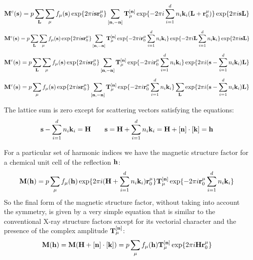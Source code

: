 \documentclass[10pt]{article}
\begin{document}
\begin{equation} \label{amplitude_mag3}
{\bf M}^c({\bf s})=p\sum_{\bf L} \sum_{{\mu}} f_{\mu}({\bf s}) \exp\{2\pi i {\bf s}{\bf r}_0^\mu\}\sum_{[{\bf n},-{\bf n}]}  {\bf T}_{\mu}^{[{\bf n}]} \exp\{ -2\pi i \sum_{i=1}^d n_i{\bf k}_i ({\bf L}+{\bf r}_0^\mu) \}  \exp\{2\pi i {\bf s}{\bf L}\}
\end{equation}
\begin{equation} \label{amplitude_mag5}
{\bf M}^c({\bf s})=p\sum_{\bf L} \sum_{{\mu}} f_{\mu}({\bf s}) \exp\{2\pi i {\bf s}{\bf r}_0^\mu\}\sum_{[{\bf n},-{\bf n}]}  {\bf T}_{\mu}^{[{\bf n}]} \exp\{ -2\pi i {\bf r}_0^\mu \sum_{i=1}^d n_i{\bf k}_i \} \exp\{ -2\pi i {\bf L} \sum_{i=1}^d n_i{\bf k}_i  \} \exp\{2\pi i {\bf s}{\bf L}\}
\end{equation}
\begin{equation} \label{amplitude_mag6}
{\bf M}^c({\bf s})=p\sum_{\bf L} \sum_{{\mu}} f_{\mu}({\bf s}) \exp\{2\pi i {\bf s}{\bf r}_0^\mu\}\sum_{[{\bf n},-{\bf n}]}  {\bf T}_{\mu}^{[{\bf n}]} \exp\{ -2\pi i {\bf r}_0^\mu \sum_{i=1}^d n_i{\bf k}_i \}  \exp\{2\pi i ({\bf s}-\sum_{i=1}^d n_i{\bf k}_i){\bf L}\}
\end{equation}
\begin{equation} \label{amplitude_mag7}
{\bf M}^c({\bf s})=p\sum_{{\mu}} f_{\mu}({\bf s}) \exp\{2\pi i {\bf s}{\bf r}_0^\mu\}\sum_{[{\bf n},-{\bf n}]}  {\bf T}_{\mu}^{[{\bf n}]} \exp\{ -2\pi i {\bf r}_0^\mu \sum_{i=1}^d n_i{\bf k}_i \}  \sum_{\bf L} \exp\{2\pi i ({\bf s}-\sum_{i=1}^d n_i{\bf k}_i){\bf L}\}
\end{equation}

The lattice sum is zero except for scattering vectors satisfying the equations:
\begin{equation} \label{laue_cond1}
{\bf s}-\sum_{i=1}^d n_i{\bf k}_i={\bf H} \qquad {\bf s}={\bf H}+\sum_{i=1}^d n_i{\bf k}_i={\bf H}+[{\bf n}]\cdot[{\bf k}]={\bf h}
\end{equation} 

For a particular set of harmonic indices we have the magnetic structure factor for a chemical unit cell of the reflection ${\bf h}$:
\begin{equation} \label{amplitude_mag8}
{\bf M}({\bf h})=p\sum_{{\mu}} f_{\mu}({\bf h}) \exp\{2\pi i ({\bf H}+\sum_{i=1}^d n_i{\bf k}_i){\bf r}_0^\mu\}  {\bf T}_{\mu}^{[{\bf n}]} \exp\{ -2\pi i {\bf r}_0^\mu \sum_{i=1}^d n_i{\bf k}_i \}  
\end{equation}
So the final form of the magnetic structure factor, without taking into account the symmetry, is given by a very simple equation that is similar to the conventional X-ray structure factors except for its vectorial character and the presence of the complex amplitude ${\bf T}_{\mu}^{[{\bf n}]}$:
\begin{equation} \label{amplitude_mag9}
{\bf M}({\bf h})={\bf M}({\bf H}+[{\bf n}]\cdot[{\bf k}])=p\sum_{{\mu}} f_{\mu}({\bf h})  {\bf T}_{\mu}^{[{\bf n}]} \exp\{2\pi i {\bf H}{\bf r}_0^\mu\}    
\end{equation}
\end{document}
